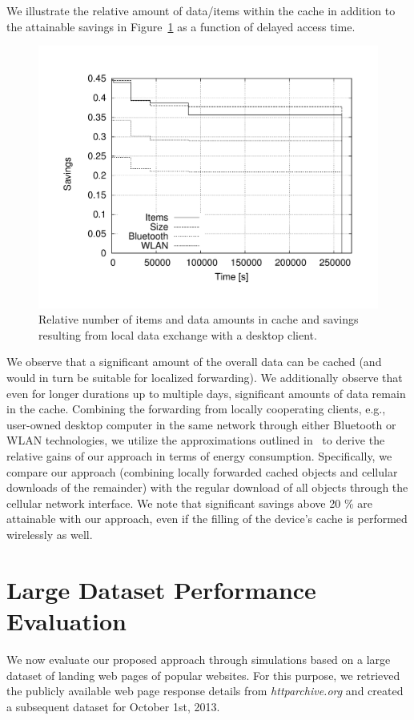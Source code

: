 \documentclass[letterpaper,conference]{IEEEtran}
\begin{document}
We illustrate the relative amount of data/items within the cache in addition to the attainable savings in Figure~\ref{fig:rel_ios_time} as a function of delayed access time. 
\begin{figure}
	\centering
	\includegraphics[width=.925\linewidth]{rel_ios_time}
	\caption{Relative number of items and data amounts in cache and savings resulting from local data exchange with a desktop client.}
	\label{fig:rel_ios_time}
\end{figure}
We observe that a significant amount of the overall data can be cached (and would in turn be suitable for localized forwarding).
We additionally observe that even for longer durations up to multiple days, significant amounts of data remain in the cache.
Combining the forwarding from locally cooperating clients, e.g., user-owned desktop computer in the same network through either Bluetooth or WLAN technologies, we utilize the approximations outlined in~\cite{Se13} to derive the relative gains of our approach in terms of energy consumption. 
Specifically, we compare our approach (combining locally forwarded cached objects and cellular downloads of the remainder) with the regular download of all objects through the cellular network interface. 
We note that significant savings above 20 \% are attainable with our approach, even if the filling of the device's cache is performed wirelessly as well.



\section{Large Dataset Performance Evaluation}
\label{s:large}
We now evaluate our proposed approach through simulations based on a large dataset of landing web pages of popular websites.
For this purpose, we retrieved the publicly available web page response details from \emph{httparchive.org} and created a subsequent dataset for October 1st, 2013.
\end{document}
